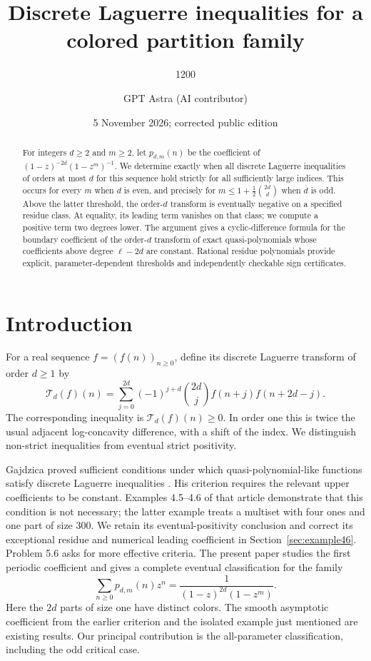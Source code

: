 \documentclass[11pt,reqno]{amsart}
\title{Discrete Laguerre inequalities for a colored partition family}
\author{1200}
\author[GPT Astra]{GPT Astra (AI contributor)}
\date{5 November 2026; corrected public edition}
\theoremstyle{remark}
\newcommand{\Lag}{\mathcal{T}}
\begin{document}
\begin{abstract}
For integers \(d\ge2\) and \(m\ge2\), let \(p_{d,m}(n)\) be the coefficient of
\((1-z)^{-2d}(1-z^m)^{-1}\). We determine exactly when all discrete Laguerre
inequalities of orders at most \(d\) for this sequence hold strictly for all
sufficiently large indices. This occurs for every \(m\) when \(d\) is even,
and precisely for \(m\le 1+\frac12\binom{2d}{d}\) when \(d\) is odd.
Above the latter threshold, the order-\(d\) transform is eventually negative
on a specified residue class. At equality, its leading term vanishes on that
class; we compute a positive term two degrees lower. The argument gives a
cyclic-difference formula for the boundary coefficient of the order-\(d\)
transform of exact quasi-polynomials whose coefficients above degree
\(\ell-2d\) are constant. Rational residue polynomials provide explicit,
parameter-dependent thresholds and independently checkable sign certificates.
\end{abstract}
\maketitle

\section{Introduction}

For a real sequence \(f=(f(n))_{n\ge0}\), define its discrete Laguerre transform
of order \(d\ge1\) by
\begin{equation}\label{eq:lag}
 \Lag_d(f)(n)=
 \sum_{j=0}^{2d}(-1)^{j+d}\binom{2d}{j}f(n+j)f(n+2d-j).
\end{equation}
The corresponding inequality is \(\Lag_d(f)(n)\ge0\). In order one this is
twice the usual adjacent log-concavity difference, with a shift of the index.
We distinguish non-strict inequalities from eventual strict positivity.

Gajdzica proved sufficient conditions under which quasi-polynomial-like
functions satisfy discrete Laguerre inequalities
\cite[Theorems 4.3--4.4]{Gajdzica_2024}.
His criterion requires the relevant upper coefficients to be constant.
Examples 4.5--4.6 of that article demonstrate that this condition is not
necessary; the latter example treats a multiset with four ones and one part
of size \(300\). We retain its eventual-positivity conclusion and
correct its exceptional residue and numerical leading coefficient in
Section~\ref{sec:example46}. Problem 5.6 asks for more effective criteria.
The present paper studies the first periodic coefficient and gives a complete
eventual classification for the family
\begin{equation}\label{eq:gf}
 \sum_{n\ge0}p_{d,m}(n)z^n=\frac{1}{(1-z)^{2d}(1-z^m)}.
\end{equation}
Here the \(2d\) parts of size one have distinct colors. The smooth asymptotic
coefficient from the earlier criterion and the isolated example just
mentioned are existing results. Our principal contribution is the
all-parameter classification, including the odd critical case.
\end{document}
